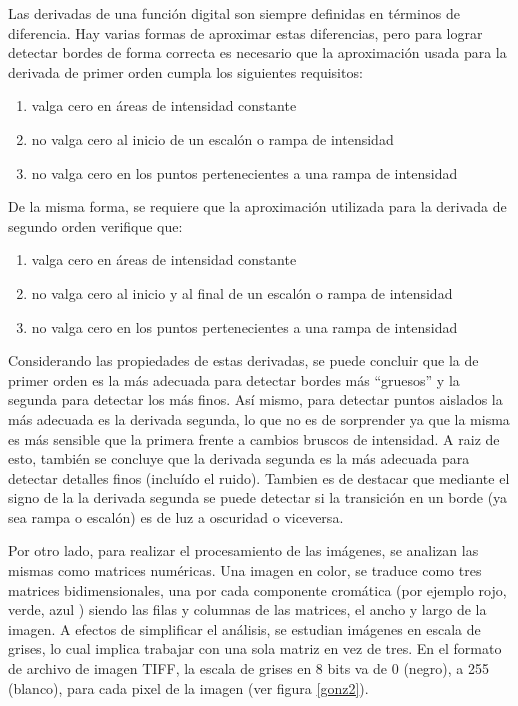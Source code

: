 Las derivadas de una función digital son siempre definidas en términos de diferencia. Hay varias formas de aproximar estas diferencias, pero para lograr detectar bordes de forma correcta es necesario que la aproximación usada para la derivada de primer orden cumpla los siguientes requisitos:

\begin{enumerate}
\item valga cero en áreas de intensidad constante
\item no valga cero al inicio de un escalón o rampa de intensidad
\item no valga cero en los puntos pertenecientes a una rampa de intensidad
\end{enumerate}

De la misma forma, se requiere que la aproximación utilizada para la derivada de segundo orden verifique que:

\begin{enumerate}
\item valga cero en áreas de intensidad constante
\item no valga cero al inicio y al final de un escalón o rampa de intensidad
\item no valga cero en los puntos pertenecientes a una rampa de intensidad
\end{enumerate}

Considerando las propiedades de estas derivadas, se puede concluir que la de primer orden es la más adecuada para detectar bordes más ``gruesos'' y la segunda para detectar los más finos. Así mismo, para detectar puntos aislados la más adecuada es la derivada segunda, lo que no es de sorprender ya que la misma es más sensible que la primera frente a cambios bruscos de intensidad. A raiz de esto, también se concluye que la derivada segunda es la más adecuada para detectar detalles finos (incluído el ruido). Tambien es de destacar que mediante el signo de la la derivada segunda se puede detectar si la transición en un borde (ya sea rampa o escalón) es de luz a oscuridad o viceversa.

Por otro lado, para realizar el procesamiento de las imágenes, se analizan las mismas como matrices numéricas. Una imagen en color, se traduce como tres matrices bidimensionales, una por cada componente cromática (por ejemplo rojo, verde, azul ) siendo las filas y columnas de las matrices, el ancho y largo de la imagen. 
A efectos de simplificar el análisis, se estudian imágenes en escala de grises, lo cual implica trabajar con una sola matriz en vez de tres. En el formato de archivo de imagen TIFF, la escala de grises en 8 bits va de 0 (negro), a 255 (blanco), para cada pixel de la imagen (ver figura \ref{gonz2}).

